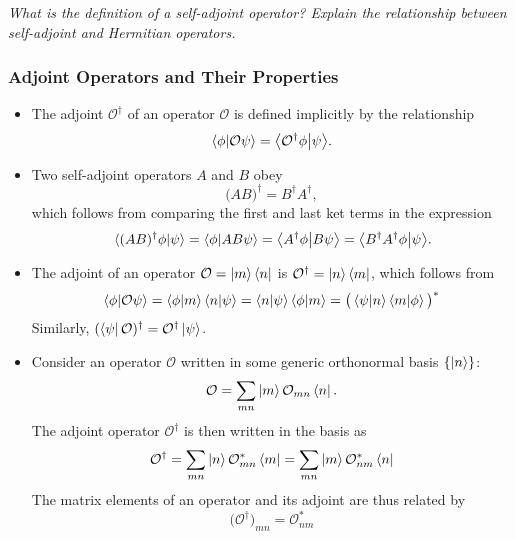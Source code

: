 \documentclass[11pt, a4paper]{article}
\newcommand{\Herm}{Hermitian\xspace}
\renewcommand{\O}{\mathcal{O}}  %
\newcommand{\p}{\psi}  %
\newcommand{\bbraket}[2]{\big \langle {#1} \big | {#2} \big \rangle}  %
\begin{document}
\vspace{2mm}
\textit{What is the definition of a self-adjoint operator? Explain the relationship between self-adjoint and \Herm operators.}

\subsubsection{Adjoint Operators and Their Properties}
\begin{itemize}
	\item The adjoint $ \O^{\dagger} $ of an operator $ \O $ is defined implicitly by the relationship
	\begin{equation*}
		\braket{\phi}{\O \p} = \bbraket{\O^{\dagger}\phi}{\p}.
	\end{equation*}

	\item Two self-adjoint operators $ A $ and $ B $ obey
	\begin{equation*}
		\big(AB\big)^{\dagger} = B^{\dagger}A^{\dagger},
	\end{equation*}
	which follows from comparing the first and last ket terms in the expression
	\begin{equation*}
        \braket*{(AB)^{\dagger}\phi}{\psi} = \braket{\phi}{AB\p} = \bbraket{A^{\dagger}\phi}{B\p} = \bbraket{B^{\dagger}A^{\dagger}\phi}{\p}.
	\end{equation*}
    
	\item The adjoint of an operator $ \O = \ket{m}\bra{n} $ is $ \O^{\dagger} = \ket{n} \bra{m} $, which follows from
	\begin{equation*}
        \braket{\phi}{\O \p} = \bra{\phi} \ket{m} \bra{n} \ket{\psi} = \braket{n}{\psi} \braket{\phi}{m} = \big(\bra{\p} \ket{n} \bra{m} \ket{\phi} \big)^{*}
	\end{equation*}
	Similarly, $ (\bra{\p}\O)^{\dagger} = \O^{\dagger}\ket{\p} $.

	\item Consider an operator $ \O $ written in some generic orthonormal basis $ \{\ket{n}\} $:
	\begin{equation*}
		\O = \sum_{mn} \ket{m}\O_{mn}\bra{n}.
	\end{equation*}
	The adjoint operator $ \O^{\dagger} $ is then written in the basis as
	\begin{equation*}
		\O^{\dagger} = \sum_{mn}\ket{n}\O_{mn}^{*}\bra{m} = \sum_{mn}\ket{m} \O_{nm}^{*}\bra{n}
	\end{equation*}
	The matrix elements of an operator and its adjoint are thus related by
	\begin{equation*}
		\big(\O^{\dagger}\big)_{mn} = \O_{nm}^{*}
	\end{equation*}
	

\end{itemize}
\end{document}
